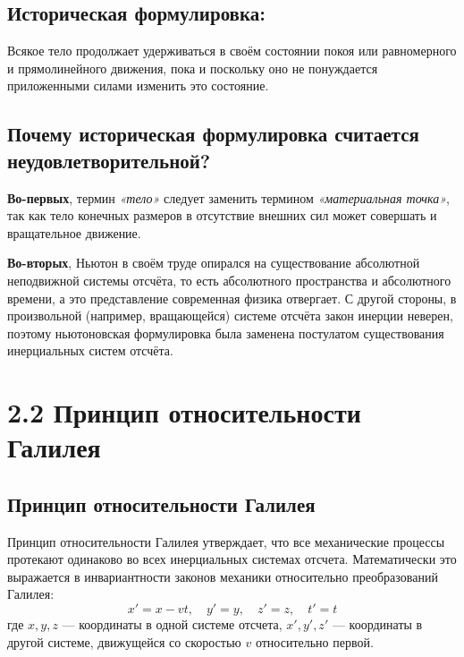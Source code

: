 \documentclass[a4paper, 12pt]{article}
\begin{document}
\vspace{-9pt}
\subsection*{Историческая формулировка:}
\vspace{-3pt}
Всякое тело продолжает удерживаться в своём состоянии покоя или равномерного и прямолинейного движения, пока и поскольку оно не понуждается приложенными силами изменить это состояние.

\vspace{-9pt}
\subsection*{Почему историческая формулировка считается неудовлетворительной?}
\vspace{-3pt}
\textbf{Во-первых}, термин \textit{«тело»} следует заменить термином \textit{«материальная точка»}, так как тело конечных размеров в отсутствие внешних сил может совершать и вращательное движение. 
\par \noindent
\textbf{Во-вторых}, Ньютон в своём труде опирался на существование абсолютной неподвижной системы отсчёта, то есть абсолютного пространства и абсолютного времени, а это представление современная физика отвергает. С другой стороны, в произвольной (например, вращающейся) системе отсчёта закон инерции неверен, поэтому ньютоновская формулировка была заменена постулатом существования инерциальных систем отсчёта.


\section*{2.2 Принцип относительности Галилея}

\vspace{-9pt}
\subsection*{Принцип относительности Галилея}
\vspace{-3pt}
Принцип относительности Галилея утверждает, что все механические процессы протекают одинаково во всех инерциальных системах отсчета. Математически это выражается в инвариантности законов механики относительно преобразований Галилея:
$$ x' = x - vt, \quad y' = y, \quad z' = z, \quad t' = t $$
где $x, y, z $ --- координаты в одной системе отсчета, $x', y', z' $ --- координаты в другой системе, движущейся со скоростью $v $ относительно первой.
\end{document}
